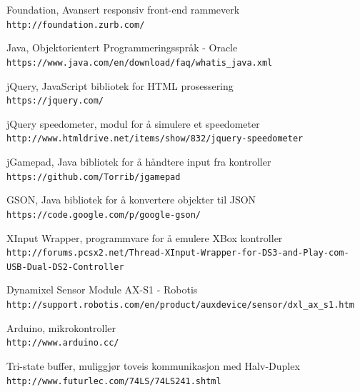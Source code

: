 \documentclass[12pt]{report}
\begin{document}
\begin{thebibliography}{3}
	Foundation, Avansert responsiv front-end rammeverk
	\\\texttt{http://foundation.zurb.com/}

	Java, Objektorientert Programmeringsspråk - Oracle
	\\\texttt{https://www.java.com/en/download/faq/whatis\_java.xml}
	
	jQuery, JavaScript bibliotek for HTML prosessering
	\\\texttt{https://jquery.com/}

	jQuery speedometer, modul for å simulere et speedometer
	\\\texttt{http://www.htmldrive.net/items/show/832/jquery-speedometer}

	jGamepad, Java bibliotek for å håndtere input fra kontroller
	\\\texttt{https://github.com/Torrib/jgamepad}

	GSON, Java bibliotek for å konvertere objekter til JSON
	\\\texttt{https://code.google.com/p/google-gson/}

	XInput Wrapper, programmvare for å emulere XBox kontroller
	\\\texttt{http://forums.pcsx2.net/Thread-XInput-Wrapper-for-DS3-and-Play-com-USB-Dual-DS2-Controller}
	
	Dynamixel Sensor Module AX-S1 - Robotis
	\\\texttt{http://support.robotis.com/en/product/auxdevice/sensor/dxl\_ax\_s1.htm}

	Arduino, mikrokontroller
	\\\texttt{http://www.arduino.cc/}
	
	Tri-state buffer, muliggjør toveis kommunikasjon med Halv-Duplex
	\\\texttt{http://www.futurlec.com/74LS/74LS241.shtml}

\end{thebibliography}

\clearpage

\medskip
\end{document}
